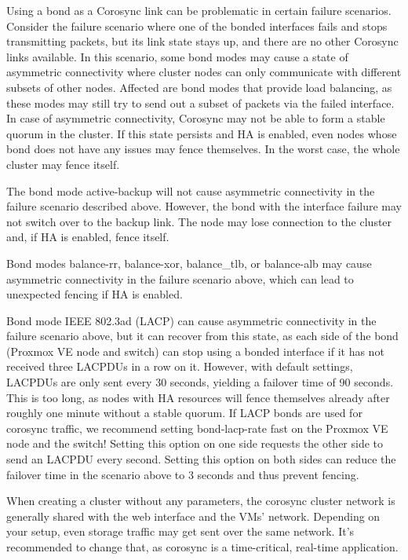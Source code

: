 Using a bond as a Corosync link can be problematic in certain failure scenarios. Consider the failure scenario where one of the bonded interfaces fails and stops transmitting packets, but its link state stays up, and there are no other Corosync links available. In this scenario, some bond modes may cause a state of asymmetric connectivity where cluster nodes can only communicate with different subsets of other nodes. Affected are bond modes that provide load balancing, as these modes may still try to send out a subset of packets via the failed interface. In case of asymmetric connectivity, Corosync may not be able to form a stable quorum in the cluster. If this state persists and HA is enabled, even nodes whose bond does not have any issues may fence themselves. In the worst case, the whole cluster may fence itself.

The bond mode active-backup will not cause asymmetric connectivity in the failure scenario described above. However, the bond with the interface failure may not switch over to the backup link. The node may lose connection to the cluster and, if HA is enabled, fence itself.

Bond modes balance-rr, balance-xor, balance_tlb, or balance-alb may cause asymmetric connectivity in the failure scenario above, which can lead to unexpected fencing if HA is enabled.

Bond mode IEEE 802.3ad (LACP) can cause asymmetric connectivity in the failure scenario above, but it can recover from this state, as each side of the bond (Proxmox VE node and switch) can stop using a bonded interface if it has not received three LACPDUs in a row on it. However, with default settings, LACPDUs are only sent every 30 seconds, yielding a failover time of 90 seconds. This is too long, as nodes with HA resources will fence themselves already after roughly one minute without a stable quorum. If LACP bonds are used for corosync traffic, we recommend setting bond-lacp-rate fast on the Proxmox VE node and the switch! Setting this option on one side requests the other side to send an LACPDU every second. Setting this option on both sides can reduce the failover time in the scenario above to 3 seconds and thus prevent fencing.

When creating a cluster without any parameters, the corosync cluster network is generally shared with the web interface and the VMs' network. Depending on your setup, even storage traffic may get sent over the same network. It’s recommended to change that, as corosync is a time-critical, real-time application.

